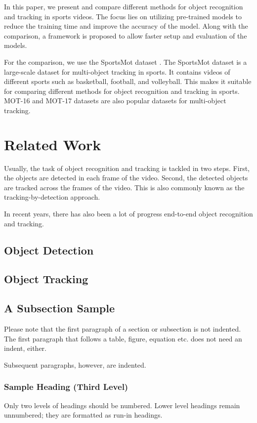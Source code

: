 \documentclass[runningheads]{llncs}
\begin{document}
In this paper, we present and compare different methods for object recognition and tracking in sports videos.
The focus lies on utilizing pre-trained models to reduce the training time and improve the accuracy of the model.
Along with the comparison, a framework is proposed to allow faster setup and evaluation of the models.

For the comparison, we use the SportsMot dataset \cite{cui2023sportsmot}.
The SportsMot dataset is a large-scale dataset for multi-object tracking in sports.
It contains videos of different sports such as basketball, football, and volleyball.
This makes it suitable for comparing different methods for object recognition and tracking in sports.
MOT-16 and MOT-17 datasets \cite{milan2016mot16} are also popular datasets for multi-object tracking.


\section{Related Work}
Usually, the task of object recognition and tracking is tackled in two steps.
First, the objects are detected in each frame of the video.
Second, the detected objects are tracked across the frames of the video.
This is also commonly known as the tracking-by-detection approach.


In recent years, there has also been a lot of progress end-to-end object recognition and tracking.



\subsection{Object Detection}

\subsection{Object Tracking}



\subsection{A Subsection Sample}
Please note that the first paragraph of a section or subsection is
not indented. The first paragraph that follows a table, figure,
equation etc. does not need an indent, either.

Subsequent paragraphs, however, are indented.

\subsubsection{Sample Heading (Third Level)} Only two levels of
headings should be numbered. Lower level headings remain unnumbered;
they are formatted as run-in headings.
\end{document}
